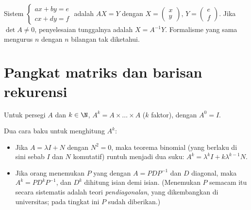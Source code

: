 \begin{method}\label{met:g12:matrix:systems}
Sistem
$\begin{cases} ax + by = e\\ cx + dy = f \end{cases}$
adalah   $AX = Y$ dengan
$X = \begin{pmatrix} x \\ y\end{pmatrix}$,
$Y = \begin{pmatrix} e \\ f\end{pmatrix}$. Jika $\det A \neq 0$, penyelesaian
tunggalnya adalah $X = A^{-1}Y$. Formalisme yang sama mengurus $n$  dengan
$n$ bilangan tak diketahui.
\end{method}

\section{Pangkat matriks dan barisan rekurensi}

\begin{definition}\label{def:g12:matrix:power}
Untuk  persegi $A$ dan $k \in \N$, $A^k = A \times \dots \times A$
($k$ faktor), dengan $A^0 = I$.
\end{definition}

\begin{method}\label{met:g12:matrix:powers}
Dua cara baku untuk menghitung $A^k$:
\begin{itemize}
  \item Jika $A = \lambda I + N$ dengan $N^2 = 0$, maka teorema binomial
        (yang berlaku di sini sebab $I$ dan $N$ komutatif) runtuh menjadi dua suku:
        $A^k = \lambda^k I + k \lambda^{k-1} N$.
  \item Jika orang menemukan $P$ yang  dengan $A = PDP^{-1}$ dan $D$
        diagonal, maka $A^k = P D^k P^{-1}$, dan $D^k$ dihitung isian demi isian.
        (Menemukan $P$ semacam itu secara sistematis adalah teori
        \emph{pendiagonalan}, yang dikembangkan di universitas; pada tingkat ini $P$
        sudah diberikan.)
\end{itemize}
\end{method}


